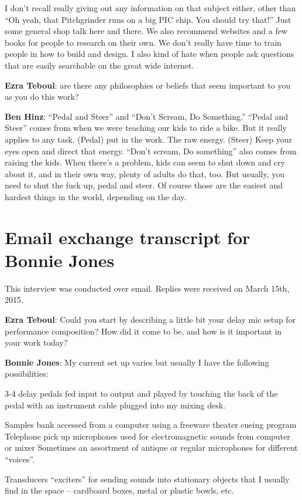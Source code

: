 I don't recall really giving out any information on that subject either, other than ``Oh yeah, that Pitchgrinder runs on a big PIC chip. You should try that!'' Just some general shop talk here and there. We also recommend websites and a few books for people to research on their own. We don’t really have time to train people in how to build and design. I also kind of hate when people ask questions that are easily searchable on the great wide internet.

\textbf{Ezra Teboul}: are there any philosophies or beliefs that seem important to you as you do this work?

\textbf{Ben Hinz}: ``Pedal and Steer'' and ``Don't Scream, Do Something.'' ``Pedal and Steer'' comes from when we were teaching our kids to ride a bike. But it really applies to any task. (Pedal) put in the work. The raw energy. (Steer) Keep your eyes open and direct that energy. ``Don't scream, Do something'' also comes from raising the kids. When there's a problem, kids can seem to shut down and cry about it, and in their own way, plenty of adults do that, too. But usually, you need to shut the fuck up, pedal and steer. Of course those are the easiest and hardest things in the world, depending on the day.

\newpage

\clearpage 
\section{Email exchange transcript for Bonnie Jones}

This interview was conducted over email. Replies were received on March 15th, 2015. 

\textbf{Ezra Teboul}: Could you start by describing a little bit your delay \/ mic setup for performance \/ composition? How did it come to be, and how is it important in your work today?

\textbf{Bonnie Jones}: My current set up varies but usually I have the following possibilities: 

3-4 delay pedals fed input to output and played by touching the back of the pedal with an instrument cable plugged into my mixing desk. 

Samples bank accessed from a computer using a freeware theater cueing program 
Telephone pick up microphones used for electromagnetic sounds from computer or mixer
Sometimes an assortment of antique or regular microphones for different ``voices''.
 
Transducers ``exciters'' for sending sounds into stationary objects that I usually find in the space – cardboard boxes, metal or plastic bowls, etc.
 
